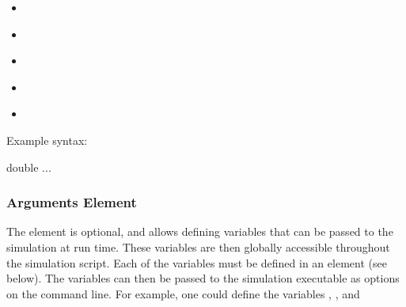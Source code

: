 \documentclass[letterpaper,10pt,english]{sphinxmanual}
\begin{document}
\begin{itemize}
\item {} 
\sphinxAtStartPar
{\hyperref[\detokenize{reference_elements:fftw}]{}}

\item {} 
\sphinxAtStartPar
{\hyperref[\detokenize{reference_elements:globals}]{}}

\item {} 
\sphinxAtStartPar
{\hyperref[\detokenize{reference_elements:openmp}]{}}

\item {} 
\sphinxAtStartPar
{\hyperref[\detokenize{reference_elements:precision}]{}}

\item {} 
\sphinxAtStartPar
{\hyperref[\detokenize{reference_elements:validation}]{}}

\end{itemize}

\sphinxAtStartPar
Example syntax:

\begin{sphinxVerbatim}[commandchars=\\\{\}]
 
     
     double 
    ...
\end{sphinxVerbatim}

\ignorespaces 

\subsubsection{Arguments Element}
\label{\detokenize{reference_elements:arguments-element}}\label{\detokenize{reference_elements:argumentselement}}\label{\detokenize{reference_elements:index-6}}
\sphinxAtStartPar
The  element is optional, and allows defining variables that can be passed to the simulation at run time. These variables are then globally accessible throughout the simulation script. Each of the variables must be defined in an  element (see below). The variables can then be passed to the simulation executable as options on the command line. For example, one could define the variables , , and 
\end{document}
